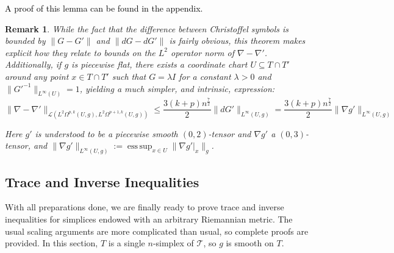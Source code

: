 \documentclass[11pt]{article}
\newtheorem{remark}[theorem]{Remark}
\newcommand{\correction}[2]{\textcolor{red}{}\textcolor{black}{#2}}
\DeclareMathOperator*{\esssup}{ess\,sup}
\begin{document}
\correction{}{A proof of this lemma can be found in the appendix.}

\begin{remark}
While the fact that the difference between Christoffel symbols is bounded by $\|G - G'\|$ and $\|dG - dG'\|$ is fairly obvious, this theorem makes explicit how they relate to bounds on the $L^2$ operator norm of $\nabla - \nabla'$. Additionally, if $g$ is piecewise flat, there exists a coordinate chart $U \subseteq T \cap T'$ around any point $x \in T \cap T'$ such that $G = \lambda I$ for a constant $\lambda > 0$ and $\|G'^{-1}\|_{L^\infty(U)} = 1$, yielding a much simpler, and intrinsic, expression:
\begin{equation}\label{simplecomparecov}\|\nabla - \nabla'\|_{\mathcal{L}(L^2\Omega^{p,k}(U,g),L^2\Omega^{p+1,k}(U,g))} \le \frac{3(k+p)n^\frac{7}{2}}{2}\|dG'\|_{L^\infty(U,g)} = \frac{3(k+p)n^\frac{7}{2}}{2}\|\nabla g'\|_{L^\infty(U,g)}\end{equation} 

Here $g'$ is understood to be a piecewise smooth $(0,2)$-tensor and $\nabla g'$ a $(0,3)$-tensor, and $\|\nabla g'\|_{L^\infty(U,g)} := \esssup_{x \in U}\|\nabla g'|_x\|_g$.
\end{remark}



\subsection{Trace and Inverse Inequalities}

With all preparations done, we are finally ready to prove trace and inverse inequalities for simplices endowed with an arbitrary Riemannian metric. The usual scaling arguments are more complicated than usual, so complete proofs are provided. In this section, $T$ is a single $n$-simplex of $\mathcal{T}$, so $g$ is smooth on $T$.
\end{document}

